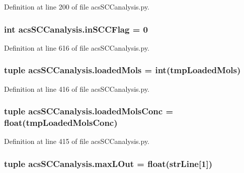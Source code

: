 Definition at line 200 of file acs\-S\-C\-Canalysis.\-py.

\hypertarget{a00102_a6405b6b05e7b87812422cc30d2034904}{
\subsubsection[{in\-S\-C\-C\-Flag}]{\setlength{\rightskip}{0pt plus 5cm}int acs\-S\-C\-Canalysis.\-in\-S\-C\-C\-Flag = 0}}\label{a00102_a6405b6b05e7b87812422cc30d2034904}


Definition at line 616 of file acs\-S\-C\-Canalysis.\-py.

\hypertarget{a00102_ab4566d46d368eb4f93ff6db5191648bd}{
\subsubsection[{loaded\-Mols}]{\setlength{\rightskip}{0pt plus 5cm}tuple acs\-S\-C\-Canalysis.\-loaded\-Mols = int(tmp\-Loaded\-Mols)}}\label{a00102_ab4566d46d368eb4f93ff6db5191648bd}


Definition at line 416 of file acs\-S\-C\-Canalysis.\-py.

\hypertarget{a00102_abe83f5e0ae3bd65da15a697a979aeea1}{
\subsubsection[{loaded\-Mols\-Conc}]{\setlength{\rightskip}{0pt plus 5cm}tuple acs\-S\-C\-Canalysis.\-loaded\-Mols\-Conc = float(tmp\-Loaded\-Mols\-Conc)}}\label{a00102_abe83f5e0ae3bd65da15a697a979aeea1}


Definition at line 415 of file acs\-S\-C\-Canalysis.\-py.

\hypertarget{a00102_a47da7b9153a0e4a33512f6d2675b8c1a}{
\subsubsection[{max\-L\-Out}]{\setlength{\rightskip}{0pt plus 5cm}tuple acs\-S\-C\-Canalysis.\-max\-L\-Out = float({\bf str\-Line}\mbox{[}1\mbox{]})}}\label{a00102_a47da7b9153a0e4a33512f6d2675b8c1a}


